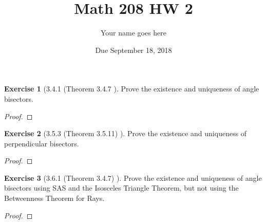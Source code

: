\documentclass[12pt]{article}		%
\title{Math 208 HW 2}
\author{Your name goes here}
\date{Due September 18, 2018}
\theoremstyle{definition}
\newtheorem*{ex}{Exercise}
\begin{document}
	\maketitle
	
	
		\begin{ex}[3.4.1 (Theorem 3.4.7 ]
		Prove the existence and uniqueness of angle bisectors.
	\end{ex}
	
	\begin{proof} 
		
	\end{proof}

\vspace{.25in}
	
	
	
		\begin{ex}[3.5.3 (Theorem 3.5.11) ]
		Prove the existence and uniqueness of perpendicular bisectors.
	\end{ex}
	
	\begin{proof} 
		
	\end{proof}

\vspace{.25in}



		\begin{ex}[3.6.1 (Theorem 3.4.7)  ]
		Prove the existence and uniqueness of angle bisectors using SAS and the Isosceles Triangle Theorem, but not using the Betweenness Theorem for Rays.
	\end{ex}
	
	\begin{proof} 
		
	\end{proof}

\vspace{.25in}
	
	
	
	
\end{document}
